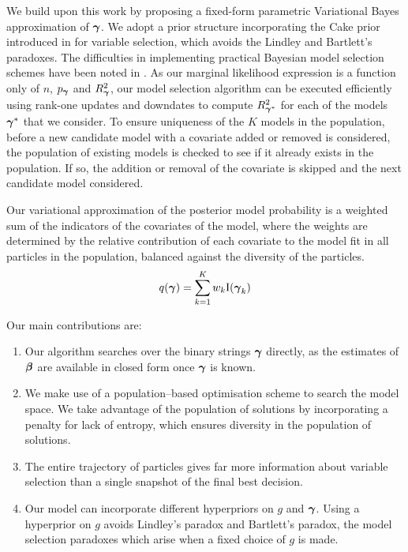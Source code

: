 We build upon this work by proposing a fixed-form parametric Variational Bayes
approximation of ${\boldsymbol \gamma}$. We adopt a prior structure incorporating the Cake
prior introduced in \cite{OrmerodEtal2017} for variable selection, which avoids
the Lindley and Bartlett's paradoxes. The difficulties in implementing
practical Bayesian model selection schemes have been noted in
\cite{Chipman2014}. As our marginal likelihood expression is a function only of
$n$, $p_{\boldsymbol \gamma}$ and $R^2_{\boldsymbol \gamma}$, our model selection algorithm can be
executed efficiently using rank-one updates and downdates to compute
$R^2_{{\boldsymbol \gamma}^*}$ for each of the models ${\boldsymbol \gamma}^*$ that we consider. To
ensure uniqueness of the $K$ models in the population, before a new candidate
model with a covariate added or removed is considered, the population of
existing models is checked to see if it already exists in the population. If
so, the addition or removal of the covariate is skipped and the next candidate
model considered.

Our variational approximation of the posterior model probability is a weighted
sum of the indicators of the covariates of the model, where the weights are
determined by the relative contribution of each covariate to the model fit in
all particles in the population, balanced against the diversity of the
particles.
\[
	q({\boldsymbol \gamma}) = \sum_{k=1}^K w_k \text{I}({\boldsymbol \gamma}_k)
\]


Our main contributions are:

\begin{enumerate}
    \item Our algorithm searches over the binary strings ${\boldsymbol \gamma}$ directly, as
        the estimates of ${\boldsymbol \beta}$ are available in closed form once ${\boldsymbol \gamma}$
        is known.

    \item We make use of a population--based optimisation scheme to search the
        model space. We take advantage of the population of solutions by
        incorporating a penalty for lack of entropy, which ensures diversity in
        the population of solutions.

    \item The entire trajectory of particles gives far more information about
        variable selection than a single snapshot of the final best decision.

    \item Our model can incorporate different hyperpriors on $g$ and ${\boldsymbol \gamma}$.
Using a hyperprior on $g$ avoids Lindley's paradox and Bartlett's paradox, the
model selection paradoxes which arise when a fixed choice of $g$ is made.
\end{enumerate}

